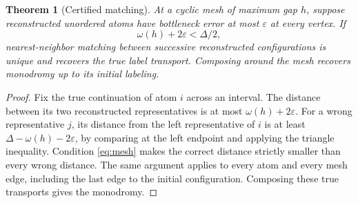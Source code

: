 \documentclass[11pt]{article}
\newtheorem{theorem}{Theorem}[section]
\theoremstyle{remark}\newtheorem{remark}[theorem]{Remark}
\begin{document}
\begin{theorem}[Certified matching]\label{thm:matching}
At a cyclic mesh of maximum gap $h$, suppose reconstructed unordered atoms have bottleneck error at most $\varepsilon$ at every vertex. If
\begin{equation}\label{eq:mesh}
 \omega(h)+2\varepsilon<\Delta/2,
\end{equation}
nearest-neighbor matching between successive reconstructed configurations is unique and recovers the true label transport. Composing around the mesh recovers monodromy up to its initial labeling.
\end{theorem}
\begin{proof}
Fix the true continuation of atom $i$ across an interval. The distance between its two reconstructed representatives is at most $\omega(h)+2\varepsilon$. For a wrong representative $j$, its distance from the left representative of $i$ is at least $\Delta-\omega(h)-2\varepsilon$, by comparing at the left endpoint and applying the triangle inequality. Condition \eqref{eq:mesh} makes the correct distance strictly smaller than every wrong distance. The same argument applies to every atom and every mesh edge, including the last edge to the initial configuration. Composing these true transports gives the monodromy.
\end{proof}
\end{document}
